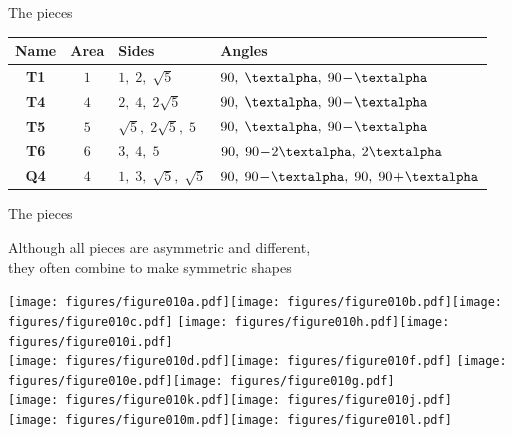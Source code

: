 \documentclass[14pt]{beamer}
\begin{document}
\begin{frame}{The pieces}
\begin{center}
            {\footnotesize
            \begin{tabular}{c|c|l|l}
                \;\;\textbf{Name}\;\; & \;\;\textbf{Area}\;\; & \;\;\textbf{Sides}          & \;\;\textbf{Angles} \\ \hline
                \textbf{T1}   & $1$           & \;\;$1,\; 2,\; \sqrt{5}$          & \;\;$90,\; \text{\textalpha},\; 90\!-\!\text{\textalpha}$   \\ \hline
                \textbf{T4}   & $4$           & \;\;$2,\; 4,\; 2\sqrt{5}$         & \;\;$90,\; \text{\textalpha},\; 90\!-\!\text{\textalpha}$   \\ \hline
                \textbf{T5}   & $5$           & \;\;$\sqrt{5},\; 2\sqrt{5},\; 5$  & \;\;$90,\; \text{\textalpha},\; 90\!-\!\text{\textalpha}$   \\ \hline
                \textbf{T6}   & $6$           & \;\;$3,\; 4,\; 5$                 & \;\;$90,\; 90\!-\!2\text{\textalpha},\; 2\text{\textalpha}$ \\ \hline
                \textbf{Q4}   & $4$           & \;\;$1,\; 3,\; \sqrt{5},\; \sqrt{5}$\;\; & \;\;$90,\; 90\!-\!\text{\textalpha},\; 90,\; 90\!+\!\text{\textalpha}$\;\;
            \end{tabular}}
        \end{center}
    \end{frame}


    \begin{frame}{The pieces}
        \begin{center}
            Although all pieces are asymmetric and different,\\they often combine to make symmetric shapes

            \bigskip \bigskip

            \texttt{[image: figures/figure010a.pdf]}\quad\texttt{[image: figures/figure010b.pdf]}\quad\texttt{[image: figures/figure010c.pdf]}\qquad
            \texttt{[image: figures/figure010h.pdf]}\quad\texttt{[image: figures/figure010i.pdf]} \\ \bigskip
            \texttt{[image: figures/figure010d.pdf]}\quad\texttt{[image: figures/figure010f.pdf]} \quad \texttt{[image: figures/figure010e.pdf]}\quad\texttt{[image: figures/figure010g.pdf]} \\ \bigskip
            \texttt{[image: figures/figure010k.pdf]}\quad\texttt{[image: figures/figure010j.pdf]} \\ \medskip
            \texttt{[image: figures/figure010m.pdf]}\quad\texttt{[image: figures/figure010l.pdf]} \\
        \end{center}
    \end{frame}
\end{document}
